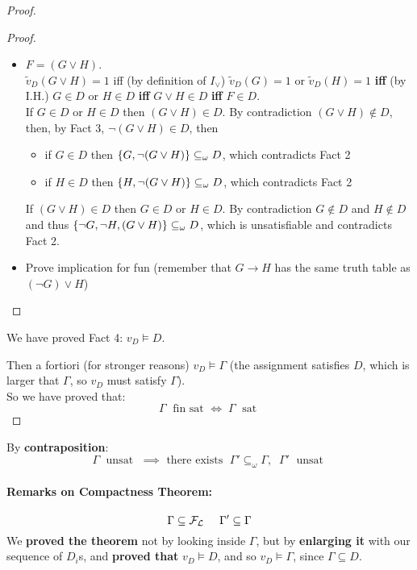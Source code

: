 \documentclass[11pt]{article}
\begin{document}
\begin{proof}
\begin{proof}
\begin{itemize}
				\item $F = (G \vee H)$.\\
				$\tilde{v}_D (G \vee H) = 1$ iff (by definition of $I_\vee$) $\tilde{v}_D (G) = 1$ or $\tilde{v}_D (H) = 1$ \textbf{iff} (by I.H.) $G \in D$ or $H \in D$ \textbf{iff} $G \vee H \in D$ \textbf{iff} $F \in D$.\\
				If $G \in D$ or $H \in D$ then $(G \vee H) \in D$. By contradiction $(G \vee H) \notin D$, then, by Fact 3, $\neg (G \vee H) \in D$, then 
				\begin{itemize}
					\item if $G \in D$ then $\{G, \neg (G \vee H)\} \subseteq_\omega D$, which contradicts Fact 2
					\item if $H \in D$ then $\{H, \neg (G \vee H)\} \subseteq_\omega D$, which contradicts Fact 2
				\end{itemize}
				If $(G \vee H) \in D$ then $G \in D$ or $H \in D$. By contradiction $G \notin D$ and $H \notin D$ and thus $\{\neg G, \neg H, (G \vee H)\} \subseteq_\omega D$, which is unsatisfiable and contradicts Fact 2.\\
				
				\item Prove implication for fun (remember that $G \rightarrow H$ has the same truth table as $(\neg G) \vee H$)
			\end{itemize}
		\end{proof}
		We have proved Fact 4: $v_D \models D$.\\
		
		\newpage
		
		Then a fortiori (for stronger reasons) $v_D \models \Gamma$ (the assignment satisfies $D$, which is larger that $\Gamma$, so $v_D$ must satisfy $\Gamma$).\\
		
		So we have proved that:
		$$ \Gamma \; \text{ fin sat } \Leftrightarrow \; \Gamma \; \text{ sat } $$
	\end{proof}
	
	By \textbf{contraposition}:
	$$ \Gamma \; \text{ unsat } \; \implies \text{ there exists } \; \Gamma ' \subseteq_\omega \Gamma, \;\; \Gamma' \; \text{ unsat } $$
	
	\paragraph{Remarks on Compactness Theorem:}
	$$ \Gamma \subseteq \mathcal{F}_\mathcal{L}  \;\;\;\;\; \Gamma' \subseteq \Gamma $$
	We \textbf{proved the theorem} not by looking inside $\Gamma$, but by \textbf{enlarging it} with our sequence of $D_i$s, and \textbf{proved that} $v_D \models D$, and so $v_D \models \Gamma$, since $\Gamma \subseteq D$.\\
	
\end{document}
